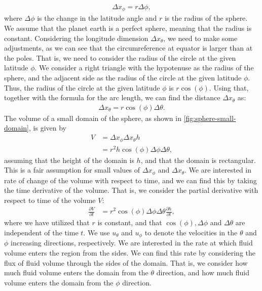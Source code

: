 \begin{align*}
    \Delta x_{\phi} = r \Delta \phi,
\end{align*}
where $\Delta \phi$ is the change in the latitude angle and $r$ is the radius of the sphere.
We assume that the planet earth is a perfect sphere, meaning that the radius is constant.
Considering the longitude dimension $\Delta x_{\theta}$, we need to make some adjustments, as we can see that the circumreference at equator is larger than at the poles.
That is, we need to consider the radius of the circle at the given latitude $\phi$.
We consider a right triangle with the hypotenuse as the radius of the sphere, and the adjacent side as the radius of the circle at the given latitude $\phi$.
Thus, the radius of the circle at the given latitude $\phi$ is $r \cos(\phi)$.
Using that, together with the formula for the arc length, we can find the distance $\Delta x_{\theta}$ as:
\begin{align*}
    \Delta x_{\theta} = r \cos(\phi) \Delta \theta.
\end{align*}
The volume of a small domain of the sphere, as shown in \autoref{fig:sphere-small-domain}, is given by 
\begin{align*}
    V &= \Delta x_{\phi} \Delta x_{\theta} h \\
    &= r^2 h \cos(\phi) \Delta \phi \Delta \theta,
\end{align*}
assuming that the height of the domain is $h$, and that the domain is rectangular.
This is a fair assumption for small values of $\Delta x_{\phi}$ and $\Delta x_{\theta}$.
We are interested in rate of change of the volume with respect to time, and we can find this by taking the time derivative of the volume.
That is, we consider the partial derivative with respect to time of the volume $V$:
\begin{align}\label{eq:sphere-volume-time-derivative}
    \frac{\partial V}{\partial t} &= r^2 \cos(\phi) \Delta \phi \Delta \theta \frac{\partial h}{\partial t},
\end{align}
where we have utilized that $r$ is constant, and that $\cos(\phi), \Delta \phi$ and $\Delta \theta$ are independent of the time $t$.
We use $u_{\theta}$ and $u_{\phi}$ to denote the velocities in the $\theta$ and $\phi$ increasing directions, respectively.
We are interested in the rate at which fluid volume enters the region from the sides.
We can find this rate by considering the flux of fluid volume through the sides of the domain.
That is, we consider how much fluid volume enters the domain from the $\theta$ direction, and how much fluid volume enters the domain from the $\phi$ direction.
